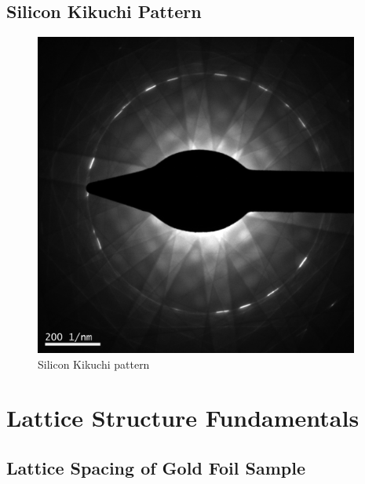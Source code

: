 \documentclass[12pt,a4paper]{article}
\begin{document}

\subsection{Silicon Kikuchi Pattern} %
\label{sub:kikuchi_pattern}

\lipsum[20]

\begin{figure}[htbp]
  \centering
  \includegraphics[width=0.95\textwidth]{data/Image6 Si_Kikuchi.png}
  \caption{Silicon Kikuchi pattern}
  \label{fig:kikuchi}
\end{figure}


\section{Lattice Structure Fundamentals} %
\label{sec:lattice_structure_fundamentals}

\lipsum[20]

\subsection{Lattice Spacing of Gold Foil Sample} %
\label{sub:lattice_spacing_of_gold_foil_sample}

\lipsum[20]
\end{document}
